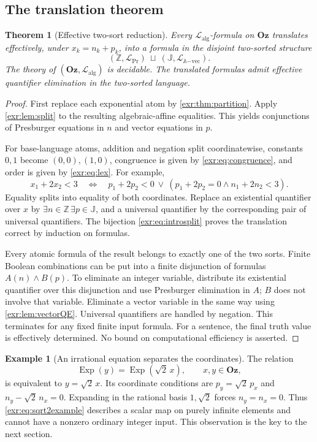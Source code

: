 \documentclass[11pt,letterpaper]{article}
\numberwithin{equation}{section}
\newtheorem{theorem}{Theorem}[section]
\theoremstyle{definition}
\newtheorem{example}[example]{Example}
\theoremstyle{remark}
\newcommand{\Oz}{\mathbf{Oz}}
\newcommand{\Z}{\mathbb Z}
\newcommand{\A}{\mathbb A}
\newcommand{\J}{\mathbb J}
\newcommand{\Lalg}{\mathcal L_{\mathrm{alg}}}
\newcommand{\LPr}{\mathcal L_{\mathrm{Pr}}}
\newcommand{\Lvec}{\mathcal L_{\A\mathrm{-vec}}}
\newcommand{\Exp}{\operatorname{Exp}}
\begin{document}
\subsection{The translation theorem}
\begin{theorem}[Effective two-sort reduction]\label{exr:thm:algdecision}
Every $\Lalg$-formula on $\Oz$ translates effectively, under $x_k=n_k+p_k$, into
a formula in the disjoint two-sorted structure
\begin{equation}\label{exr:eq:twosort}
 (\Z,\LPr)\ \sqcup\ (\J,\Lvec).
\end{equation}
The theory of $(\Oz,\Lalg)$ is decidable. The translated formulas admit effective
quantifier elimination in the two-sorted language.
\end{theorem}
\begin{proof}
First replace each exponential atom by \cref{exr:thm:partition}. Apply
\cref{exr:lem:split} to the resulting algebraic-affine equalities. This yields
conjunctions of Presburger equations in $n$ and vector equations in $p$.

For base-language atoms, addition and negation split coordinatewise, constants
$0,1$ become $(0,0),(1,0)$, congruence is given by \eqref{exr:eq:congruence}, and order
is given by \eqref{exr:eq:lex}. For example,
\begin{equation}
 x_1+2x_2<3\quad\Longleftrightarrow\quad
 p_1+2p_2<0\ \lor\
 (p_1+2p_2=0\land n_1+2n_2<3).
\end{equation}
Equality splits into equality of both coordinates. Replace an existential
quantifier over $x$ by $\exists n\in\Z\,\exists p\in\J$, and a universal quantifier
by the corresponding pair of universal quantifiers. The bijection
\eqref{exr:eq:introsplit} proves the translation correct by induction on formulas.

Every atomic formula of the result belongs to exactly one of the two sorts.
Finite Boolean combinations can be put into a finite disjunction of formulas
$A(n)\land B(p)$. To eliminate an integer variable, distribute its existential
quantifier over this disjunction and use Presburger elimination in $A$; $B$ does
not involve that variable. Eliminate a vector variable in the same way using
\cref{exr:lem:vectorQE}. Universal quantifiers are handled by negation. This terminates
for any fixed finite input formula. For a sentence, the final truth value is
effectively determined. No bound on computational efficiency is asserted.
\end{proof}

\begin{example}[An irrational equation separates the coordinates]
The relation
\begin{equation}\label{exr:eq:sqrt2example}
 \Exp(y)=\Exp(\sqrt2\,x),\qquad x,y\in\Oz,
\end{equation}
is equivalent to $y=\sqrt2\,x$. Its coordinate conditions are
$p_y=\sqrt2\,p_x$ and $n_y-\sqrt2\,n_x=0$. Expanding in the rational basis
$1,\sqrt2$ forces $n_y=n_x=0$. Thus \eqref{exr:eq:sqrt2example} describes a scalar
map on purely infinite elements and cannot have a nonzero ordinary integer input.
This observation is the key to the next section.
\end{example}
\end{document}
